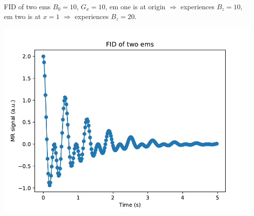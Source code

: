\documentclass{beamer}
\begin{document}
\begin{frame}{FID of two ems}
$B_0 = 10$, $G_x = 10$, em one is at origin $\Rightarrow$ experiences $B_z = 10$, em two is at $x = 1$ $\Rightarrow$ experiences $B_z = 20$.
\begin{center}
\includegraphics[height=0.8\textheight]{fid_two_ems}
\end{center}
\end{frame}
\end{document}

